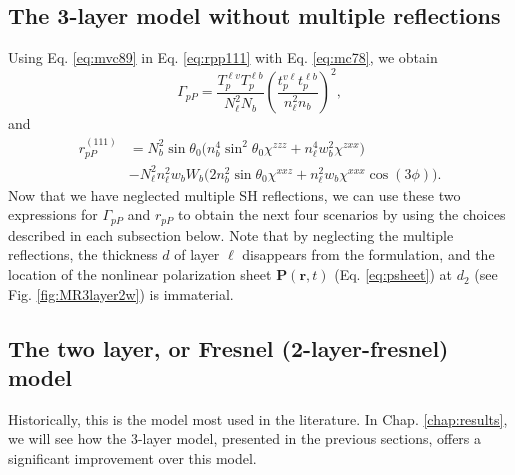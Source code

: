 
\subsection{The 3-layer model without multiple reflections}\label{sec:nomr}

Using Eq. \eqref{eq:mvc89} in Eq. \eqref{eq:rpp111} with Eq. \eqref{eq:mc78}, we
obtain
\begin{equation}\label{eq:gamma111nomr}
\Gamma_{pP}=
\frac{T_{p}^{\ell v}T^{\ell b}_{p}}{N^{2}_{\ell}N_{b}}
\left(\frac{t_{p}^{v\ell}t^{\ell b}_{p}}{n^{2}_{\ell}n_{b}}\right)^{2},  
\end{equation}
and
\begin{equation}\label{eq:rpp111nomr}
\begin{split}
r^{(111)}_{pP}& =
N^{2}_{b}\sin\theta_{0}
\Big(
  n^{4}_{b}\sin^{2}\theta_{0}\chi^{zzz} + n^{4}_{\ell}w^2_{b}\chi^{zxx}
\Big)\\
&- N^{2}_{\ell}n^{2}_{\ell}w_{b}W_{b}
\Big(
  2n^{2}_{b}\sin\theta_{0}\chi^{xxz} + n^{2}_{\ell}w_{b}\chi^{xxx}\cos(3\phi) 
\Big).
\end{split}
\end{equation}
Now that we have neglected multiple SH reflections, we can use these two
expressions for $\Gamma_{pP}$ and $r_{pP}$ to obtain the next four scenarios by
using the choices described in each subsection below. Note that by neglecting
the multiple reflections, the thickness $d$ of layer $\ell$ disappears from the
formulation, and the location of the nonlinear polarization sheet
$\mathbf{P}(\mathbf{r},t)$ (Eq. \eqref{eq:psheet}) at $d_{2}$ (see Fig.
\ref{fig:MR3layer2w}) is immaterial.



\subsection{The two layer, or Fresnel (2-layer-fresnel) model}
\label{sec:2-layer-fresnel}

Historically, this is the model most used in the literature. In Chap.
\ref{chap:results}, we will see how the 3-layer model, presented in the previous
sections, offers a significant improvement over this model. 

